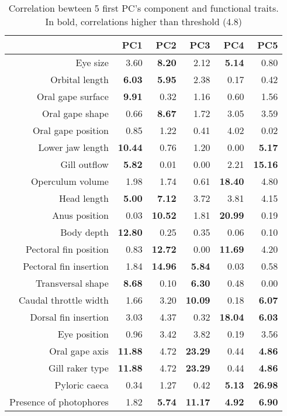 \begin{table}[ht]
\centering
\label{table:cont_abs}
\caption{Correlation bewteen 5 first PC's component and functional traits. In bold, correlations higher than threshold (4.8)}
\begin{adjustbox}{max width=1.1\textwidth,center}
\begin{tabular}{rrrrrr}
  \hline
 & PC1 & PC2 & PC3 & PC4 & PC5 \\ 
  \hline
Eye size & 3.60 & \textbf{8.20} & 2.12 & \textbf{5.14} & 0.80 \\ 
  Orbital length & \textbf{6.03} & \textbf{5.95} & 2.38 & 0.17 & 0.42 \\ 
  Oral gape surface & \textbf{9.91} & 0.32 & 1.16 & 0.60 & 1.56 \\ 
  Oral gape shape & 0.66 & \textbf{8.67} & 1.72 & 3.05 & 3.59 \\ 
  Oral gape position & 0.85 & 1.22 & 0.41 & 4.02 & 0.02 \\ 
  Lower jaw length & \textbf{10.44} & 0.76 & 1.20 & 0.00 & \textbf{5.17} \\ 
  Gill outflow & \textbf{5.82} & 0.01 & 0.00 & 2.21 & \textbf{15.16} \\ 
  Operculum volume & 1.98 & 1.74 & 0.61 & \textbf{18.40} & 4.80 \\ 
  Head length & \textbf{5.00} & \textbf{7.12} & 3.72 & 3.81 & 4.15 \\ 
  Anus position & 0.03 & \textbf{10.52} & 1.81 & \textbf{20.99} & 0.19 \\ 
  Body depth & \textbf{12.80} & 0.25 & 0.35 & 0.06 & 0.10 \\ 
  Pectoral fin position & 0.83 & \textbf{12.72} & 0.00 & \textbf{11.69} & 4.20 \\ 
  Pectoral fin insertion & 1.84 & \textbf{14.96} & \textbf{5.84} & 0.03 & 0.58 \\ 
  Transversal shape & \textbf{8.68} & 0.10 & \textbf{6.30} & 0.48 & 0.00 \\ 
  Caudal throttle width & 1.66 & 3.20 & \textbf{10.09} & 0.18 & \textbf{6.07} \\ 
  Dorsal fin insertion & 3.03 & 4.37 & 0.32 & \textbf{18.04} & \textbf{6.03} \\ 
  Eye position & 0.96 & 3.42 & 3.82 & 0.19 & 3.56 \\ 
  Oral gape axis & \textbf{11.88} & 4.72 & \textbf{23.29} & 0.44 & \textbf{4.86} \\
  Gill raker type & \textbf{11.88} & 4.72 & \textbf{23.29} & 0.44 & \textbf{4.86} \\ 
  Pyloric caeca & 0.34 & 1.27 & 0.42 & \textbf{5.13} & \textbf{26.98} \\ 
  Presence of photophores & 1.82 & \textbf{5.74} & \textbf{11.17} & \textbf{4.92} & \textbf{6.90} \\ 
   \hline
\end{tabular}
\end{adjustbox}
\end{table}

